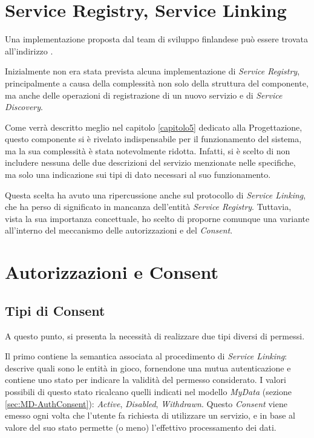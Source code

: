 \section{Service Registry, Service Linking}
Una implementazione proposta dal team di sviluppo finlandese pu\`o essere trovata all’indirizzo \cite{githubmydataserviceregistry}. 

Inizialmente non era stata prevista alcuna implementazione di \textit{Service Registry}, principalmente a causa della complessit\`a non solo della struttura del componente, ma anche delle operazioni di registrazione di un nuovo servizio e di \textit{Service Discovery}.

Come verr\`a descritto meglio nel capitolo \ref{capitolo5} dedicato alla Progettazione, questo componente si \`e rivelato indispensabile per il funzionamento del sistema, ma la sua complessit\`a \`e stata notevolmente ridotta. Infatti, si \`e scelto di non includere nessuna delle due descrizioni del servizio menzionate nelle specifiche, ma solo una indicazione sui tipi di dato necessari al suo funzionamento.

Questa scelta ha avuto una ripercussione anche sul protocollo di \textit{Service Linking}, che ha perso di significato in mancanza dell’entit\`a \textit{Service Registry}. Tuttavia, vista la sua importanza concettuale, ho scelto di proporne comunque una variante all’interno del meccanismo delle autorizzazioni e del \textit{Consent}.

\section{Autorizzazioni e Consent}
\subsection{Tipi di Consent}
\label{subsec:A-Consent}
A questo punto, si presenta la necessit\`a di realizzare due tipi diversi di permessi.

Il primo contiene la semantica associata al procedimento di \textit{Service Linking}: descrive quali sono le entit\`a in gioco, fornendone una mutua autenticazione e contiene uno stato per indicare la validit\`a del permesso considerato. I valori possibili di questo stato ricalcano quelli indicati nel modello \textit{MyData} (sezione \ref{sec:MD-AuthConsent}): \textit{Active}, \textit{Disabled}, \textit{Withdrawn}. Questo \textit{Consent} viene emesso ogni volta che l’utente fa richiesta di utilizzare un servizio, e in base al valore del suo stato permette (o meno) l’effettivo processamento dei dati.

